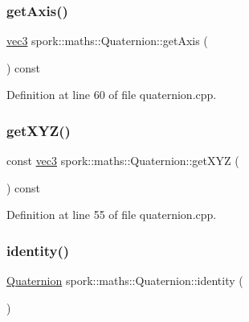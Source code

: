\subsubsection{\texorpdfstring{get\+Axis()}{getAxis()}}
{\footnotesize\ttfamily \hyperlink{structspork_1_1maths_1_1vec3}{vec3} spork\+::maths\+::\+Quaternion\+::get\+Axis (\begin{DoxyParamCaption}{ }\end{DoxyParamCaption}) const}



Definition at line 60 of file quaternion.\+cpp.

\mbox{\label{structspork_1_1maths_1_1_quaternion_a4eea744d712b05998e1be2db1fed60c4}} 
\subsubsection{\texorpdfstring{get\+X\+Y\+Z()}{getXYZ()}}
{\footnotesize\ttfamily const \hyperlink{structspork_1_1maths_1_1vec3}{vec3} spork\+::maths\+::\+Quaternion\+::get\+X\+YZ (\begin{DoxyParamCaption}{ }\end{DoxyParamCaption}) const}



Definition at line 55 of file quaternion.\+cpp.

\mbox{\label{structspork_1_1maths_1_1_quaternion_a852176a071c37d949a20f60240f4f977}} 
\subsubsection{\texorpdfstring{identity()}{identity()}}
{\footnotesize\ttfamily \hyperlink{structspork_1_1maths_1_1_quaternion}{Quaternion} spork\+::maths\+::\+Quaternion\+::identity (\begin{DoxyParamCaption}{ }\end{DoxyParamCaption})\hspace{0.3cm}{\ttfamily [static]}}



